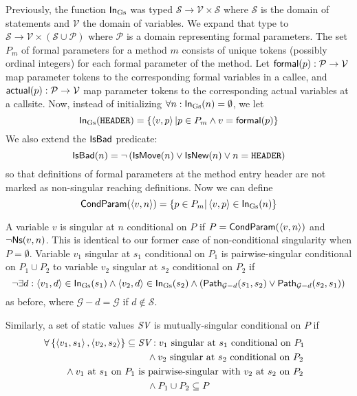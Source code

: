 \documentclass[11pt,notitlepage]{article}
\newcommand{\bigvar}[1]{\ensuremath{\text{\it #1}}}
\newcommand{\func}[1]{\ensuremath{\text{\sffamily #1}}}
\begin{document}
Previously, the function $\func{In}_\text{Gs}$ was typed
$\mathcal{S\to V\times S}$
where $\mathcal{S}$ is the domain of statements
and $\mathcal{V}$ the domain of variables.
We expand that type to
$\mathcal{S\to V\times (S\cup P)}$ where $\mathcal{P}$ is a domain
representing formal parameters.  The set $P_m$ of formal parameters for
a method $m$ consists of unique tokens (possibly ordinal integers) for
each formal parameter of the method.  Let
$\func{formal}(p):\mathcal{P\to V}$ map parameter tokens to the
corresponding formal variables in a callee, and
$\func{actual}(p):\mathcal{P\to V}$ map parameter tokens to the
corresponding actual variables at a callsite.
Now, instead of initializing $\forall n :
\func{In}_\text{Gs}(n)=\emptyset$, we let
\begin{displaymath}
\func{In}_\text{Gs}(\text{\tt HEADER}) =
   \left\{ \tuple{v,p} | p\in P_m \wedge v=\func{formal}(p) \right\}
\end{displaymath}
We also extend the $\func{IsBad}$ predicate:
\begin{displaymath}
\func{IsBad}(n) = \neg\left(\func{IsMove}(n) \vee \func{IsNew}(n) \vee
                            n = \text{\tt HEADER} \right)
\end{displaymath}
so that definitions of formal parameters at the method entry header
are not marked as non-singular reaching definitions.  Now we can define
\begin{displaymath}
\func{CondParam}(\tuple{v,n}) =
    \left\{ p\in P_m | \tuple{v,p}\in \func{In}_\text{Gs}(n) \right\}
\end{displaymath}

A variable $v$ is singular at $n$ conditional on $P$ if
$P=\func{CondParam}(\tuple{v,n})$ and $\neg\func{Ns}(v,n)$.  This
is identical to our former case of non-conditional singularity
when $P=\emptyset$.  Variable $v_1$ singular at $s_1$ conditional on
$P_1$ is pairwise-singular conditional on $P_1\cup P_2$ to variable
$v_2$ singular at $s_2$ conditional on $P_2$ if
\begin{displaymath}
\neg\exists 
     d : \tuple{v_1, d} \in \func{In}_\text{Gs}(s_1) \wedge
         \tuple{v_2, d} \in \func{In}_\text{Gs}(s_2) \wedge
\left(\func{Path}_{\mathcal{G}-d}(s_1, s_2) \vee
      \func{Path}_{\mathcal{G}-d}(s_2, s_1) \right)
\end{displaymath}
as before, where $\mathcal{G}-d=\mathcal{G}$ if $d\notin\mathcal{S}$.

Similarly, a set of static values $\bigvar{SV}$ is
mutually-singular conditional on $P$ if
\begin{multline*}
\forall \left\{ \tuple{v_1,s_1}, \tuple{v_2,s_2} \right\} \subseteq
        \bigvar{SV} :
\hfill
v_1 \text{ singular at } s_1 \text{ conditional on } P_1
\mspace{-2mu}\quad\\\shoveright{{}\wedge
v_2 \text{ singular at } s_2 \text{ conditional on } P_2
}\\\shoveright{{}\wedge
v_1 \text{ at } s_1 \text{ on } P_1
\text{ is pairwise-singular with }
v_2 \text{ at } s_2 \text{ on } P_2
}\\{}\wedge
P_1 \cup P_2 \subseteq P
\end{multline*}
\end{document}
